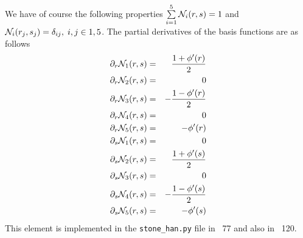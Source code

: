 We have of course the following properties $\sum\limits_{i=1}^5 {\mathcal{N}}_i(r,s) = 1$ and 
${\mathcal{N}}_i(r_j,s_j) = \delta_{ij},\;  i,j \in 1,5$. 
The partial derivatives of the basis functions are as follows
\begin{eqnarray}
\partial_r {\mathcal{N}}_1(r,s) &=& \frac{1 + \phi'(r)}{2} \nonumber\\
\partial_r {\mathcal{N}}_2(r,s) &=& 0 \nonumber\\
\partial_r {\mathcal{N}}_3(r,s) &=& -\frac{1-\phi'(r)}{2} \nonumber\\
\partial_r {\mathcal{N}}_4(r,s) &=& 0 \nonumber\\
\partial_r {\mathcal{N}}_5(r,s) &=& -\phi'(r) \nonumber\\
\partial_s {\mathcal{N}}_1(r,s) &=& 0 \nonumber\\
\partial_s {\mathcal{N}}_2(r,s) &=& \frac{1 + \phi'(s)}{2} \nonumber\\
\partial_s {\mathcal{N}}_3(r,s) &=&  0 \nonumber\\
\partial_s {\mathcal{N}}_4(r,s) &=& -\frac{1-\phi'(s)}{2} \nonumber\\
\partial_s {\mathcal{N}}_5(r,s) &=& -\phi'(s) \nonumber
\end{eqnarray}
This element is implemented in the {\tt stone\_han.py} file in \stone~77 and also in \stone~120. 






